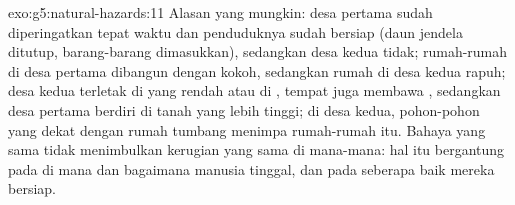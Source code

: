 \begin{solution}{exo:g5:natural-hazards:11}
Alasan yang mungkin: desa pertama sudah diperingatkan tepat waktu dan
penduduknya sudah bersiap (daun jendela ditutup, barang-barang dimasukkan),
sedangkan desa kedua tidak; rumah-rumah di desa pertama dibangun dengan
kokoh, sedangkan rumah di desa kedua rapuh; desa kedua terletak di 
yang rendah atau di , tempat  juga membawa ,
sedangkan desa pertama berdiri di tanah yang lebih tinggi; di desa kedua,
pohon-pohon yang dekat dengan rumah tumbang menimpa rumah-rumah itu. Bahaya
yang sama tidak menimbulkan kerugian yang sama di mana-mana: hal itu
bergantung pada di mana dan bagaimana manusia tinggal, dan pada seberapa
baik mereka bersiap.
\end{solution}
